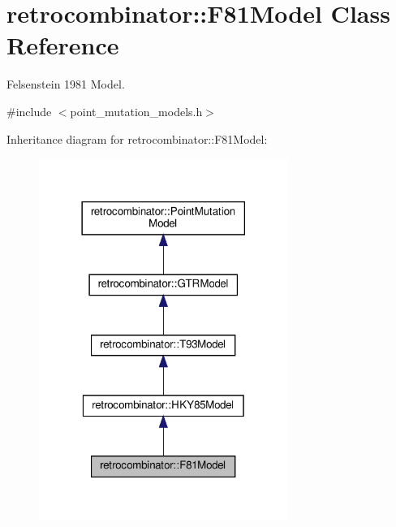 \hypertarget{classretrocombinator_1_1F81Model}{}\section{retrocombinator\+:\+:F81\+Model Class Reference}
\label{classretrocombinator_1_1F81Model}


Felsenstein 1981 Model.  




{\ttfamily \#include $<$point\+\_\+mutation\+\_\+models.\+h$>$}



Inheritance diagram for retrocombinator\+:\+:F81\+Model\+:
\nopagebreak
\begin{figure}[H]
\begin{center}
\leavevmode
\includegraphics[width=230pt]{classretrocombinator_1_1F81Model__inherit__graph}
\end{center}
\end{figure}


